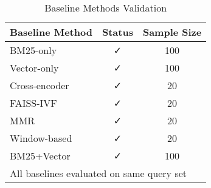 \begin{table}[htbp]
\centering
\caption{Baseline Methods Validation}
\label{tab:baseline-validation}
\begin{tabular}{lcc}
\toprule
Baseline Method & Status & Sample Size \\
\midrule
BM25-only & ✓ & 100 \\
Vector-only & ✓ & 100 \\
Cross-encoder & ✓ & 20 \\
FAISS-IVF & ✓ & 20 \\
MMR & ✓ & 20 \\
Window-based & ✓ & 20 \\
BM25+Vector & ✓ & 100 \\
\bottomrule
\multicolumn{3}{l}{\small All baselines evaluated on same query set} \\
\end{tabular}
\end{table}
